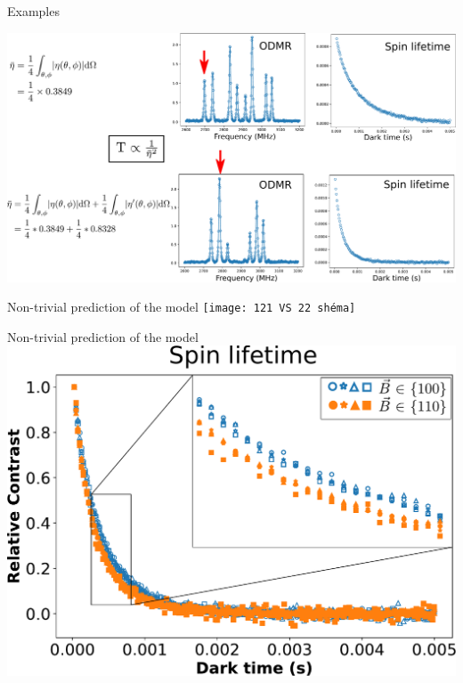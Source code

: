 \documentclass{beamer}
\begin{document}
\begin{frame}{Examples}

%

\centering
\includegraphics[width=\textwidth,height=0.9\textheight,keepaspectratio]{Exemple fluct 121 1x4}
\end{frame}

\begin{frame}{Non-trivial prediction of the model}
\centering
\texttt{[image: 121 VS 22 shéma]}
\end{frame}
\begin{frame}{Non-trivial prediction of the model}
\centering
\includegraphics[width=\textwidth,height=0.9\textheight,keepaspectratio]{121 Vs 22 combined}
\end{frame}
\end{document}
